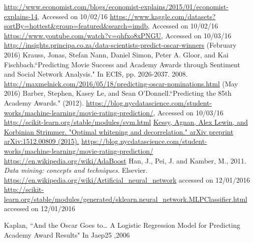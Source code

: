 \documentclass[journal,transmag]{IEEEtran}
\begin{document}
	\begin{thebibliography}{1}

  \url{http://www.economist.com/blogs/economist-explains/2015/01/economist-explains-14}, Accessed on 10/02/16
 \url{https://www.kaggle.com/datasets?sortBy=hottest&group=featured&search=imdb}, Accessed on 10/02/16
 \url{https://www.youtube.com/watch?v=qhfxo8xPNGU}, Accessed on 10/03/16
  \url{http://insights.principa.co.za/data-scientists-predict-oscar-winners} (February 2016)
 Krauss, Jonas, Stefan Nann, Daniel Simon, Peter A. Gloor, and Kai Fischbach.``Predicting Movie Success and Academy Awards through Sentiment and Social Network Analysis." In ECIS, pp. 2026-2037. 2008.
  \url{http://maxmelnick.com/2016/05/18/predicting-oscar-nominations.html} (May 2016)
 Barber, Stephen, Kasey Le, and Sean O’Donnell.``Predicting the 85th Academy Awards." (2012).
 \url{https://blog.nycdatascience.com/student-works/machine-learning/movie-rating-prediction/}, Accessed on 10/03/16
 \url{http://scikit-learn.org/stable/modules/svm.html}
 \url{Kessy, Agnan, Alex Lewin, and Korbinian Strimmer. "Optimal whitening and decorrelation." arXiv preprint arXiv:1512.00809 (2015).}
 \url{https://blog.nycdatascience.com/student-works/machine-learning/movie-rating-prediction/}
 \url{https://en.wikipedia.org/wiki/AdaBoost}
 Han, J., Pei, J. and Kamber, M., 2011. \emph{Data mining: concepts and techniques}. Elsevier.
 \url{https://en.wikipedia.org/wiki/Artificial_neural_network} accessed on 12/01/2016
 \url{http://scikit-learn.org/stable/modules/generated/sklearn.neural_network.MLPClassifier.html} accessed on 12/01/2016

 Kaplan, ``And the Oscar Goes to… A Logistic Regression Model for Predicting Academy Award Results" In Jaep25 ,2006
\end{thebibliography}
	
\end{document}
